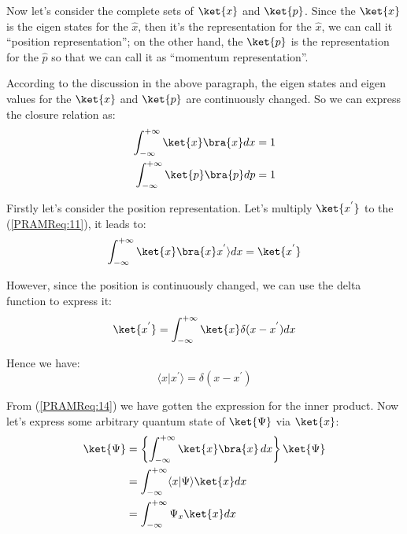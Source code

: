 Now let's consider the complete sets of $\ket{x}$ and $\ket{p}$. Since
the $\ket{x}$ is the eigen states for the $\hat{x}$, then it's the
representation for the $\hat{x}$, we can call it ``position
representation''; on the other hand, the $\ket{p}$ is the
representation for the $\hat{p}$ so that we can call it as ``momentum
representation''.

According to the discussion in the above paragraph, the eigen states
and eigen values for the $\ket{x}$ and $\ket{p}$ are continuously
changed. So we can express the closure relation as:
\begin{align}
\label{PRAMReq:11}
  \int^{+\infty}_{-\infty}\ket{x}\bra{x}dx &= 1 \nonumber \\
  \int^{+\infty}_{-\infty}\ket{p}\bra{p}dp &= 1
\end{align}

Firstly let's consider the position representation. Let's multiply
$\ket{x^{'}}$ to the (\ref{PRAMReq:11}), it leads to:
\begin{equation}
  \label{PRAMReq:12}
    \int^{+\infty}_{-\infty}\ket{x}\bra{x} x^{'}\rangle dx =
    \ket{x^{'}}
\end{equation}

However, since the position is continuously changed, we can use the
delta function to express it:
\begin{equation}
  \label{PRAMReq:13}
  \ket{x^{'}}  = \int^{+\infty}_{-\infty}
  \ket{x}\delta(x - x^{'}) dx
\end{equation}

Hence we have:
\begin{equation}
  \label{PRAMReq:14}
 \langle x|x^{'} \rangle = \delta(x - x^{'})
\end{equation}

From (\ref{PRAMReq:14}) we have gotten the expression for the inner
product. Now let's express some arbitrary quantum state of
$\ket{\Psi}$ via $\ket{x}$:
\begin{align}
  \label{PRAMReq:15}
\ket{\Psi} &= \left\{\int^{+\infty}_{-\infty}  \ket{x}\bra{x}\,
dx\right\}\ket{\Psi}\nonumber \\
&=\int^{+\infty}_{-\infty}  \langle x|\Psi \rangle
\ket{x} dx \nonumber \\
&= \int^{+\infty}_{-\infty} \Psi_{x}\ket{x} dx
\end{align}

